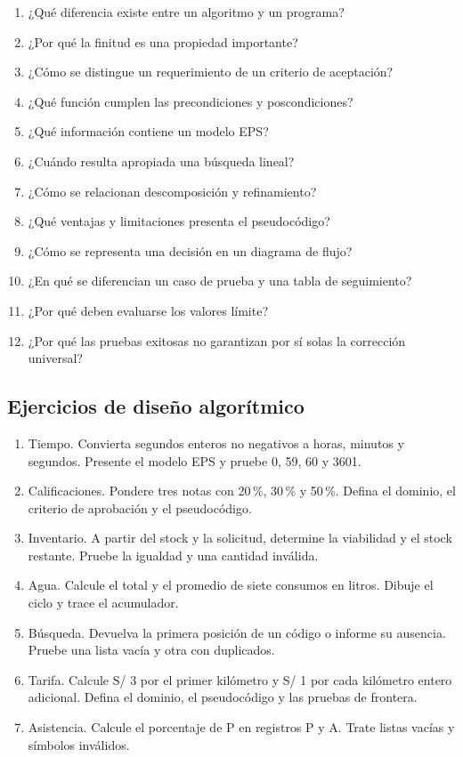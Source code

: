 \begin{enumerate}
\item ¿Qué diferencia existe entre un algoritmo y un programa?
\item ¿Por qué la finitud es una propiedad importante?
\item ¿Cómo se distingue un requerimiento de un criterio de aceptación?
\item ¿Qué función cumplen las precondiciones y poscondiciones?
\item ¿Qué información contiene un modelo EPS?
\item ¿Cuándo resulta apropiada una búsqueda lineal?
\item ¿Cómo se relacionan descomposición y refinamiento?
\item ¿Qué ventajas y limitaciones presenta el pseudocódigo?
\item ¿Cómo se representa una decisión en un diagrama de flujo?
\item ¿En qué se diferencian un caso de prueba y una tabla de seguimiento?
\item ¿Por qué deben evaluarse los valores límite?
\item ¿Por qué las pruebas exitosas no garantizan por sí solas la corrección universal?
\end{enumerate}

\subsection{Ejercicios de diseño algorítmico}

\begin{enumerate}
\item Tiempo. Convierta segundos enteros no negativos a horas, minutos y segundos. Presente el modelo EPS y pruebe 0, 59, 60 y 3601.
\item Calificaciones. Pondere tres notas con 20\,\%, 30\,\% y 50\,\%. Defina el dominio, el criterio de aprobación y el pseudocódigo.
\item Inventario. A partir del stock y la solicitud, determine la viabilidad y el stock restante. Pruebe la igualdad y una cantidad inválida.
\item Agua. Calcule el total y el promedio de siete consumos en litros. Dibuje el ciclo y trace el acumulador.
\item Búsqueda. Devuelva la primera posición de un código o informe su ausencia. Pruebe una lista vacía y otra con duplicados.
\item Tarifa. Calcule S/ 3 por el primer kilómetro y S/ 1 por cada kilómetro entero adicional. Defina el dominio, el pseudocódigo y las pruebas de frontera.
\item Asistencia. Calcule el porcentaje de P en registros P y A. Trate listas vacías y símbolos inválidos.
\end{enumerate}

